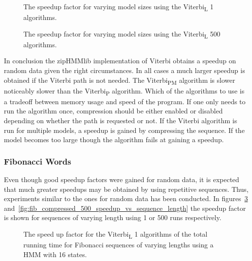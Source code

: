 \begin{figure}
  \centering
  
  \caption{The speedup factor for varying model sizes using the Viterbi\textsubscript{L} 1
    algorithms.}
  \label{fig:speedup_vs_N}
\end{figure}

\begin{figure}
  \centering
  
  \caption{The speedup factor for varying model sizes using the Viterbi\textsubscript{L} 500
    algorithms.}
  \label{fig:speedup_vs_N2}
\end{figure}

In conclusion the zipHMMlib implementation of Viterbi obtains a speedup on
random data given the right circumstances. In all cases a much larger speedup
is obtained if the Viterbi path is not needed. The Viterbi\textsubscript{PM}
algorithm is slower noticeably slower than the Viterbi\textsubscript{P} algorithm. Which
of the algorithms to use is a tradeoff between memory usage and speed of the
program. If one only needs to run the algorithm once, compression should be
either enabled or disabled depending on whether the path is requested or
not. If the Viterbi algorithm is run for multiple models, a speedup is gained
by compressing the sequence. If the model becomes too large though the
algorithm fails at gaining a speedup.

\subsubsection{Fibonacci Words}

Even though good speedup factors were gained for random data, it is expected
that much greater speedups may be obtained by using repetitive
sequences. Thus, experiments similar to the ones for random data has been
conducted. In figures~\ref{fig:fib_compressed_1_speedup_vs_sequence_length}
and~\ref{fig:fib_compressed_500_speedup_vs_sequence_length} the speedup factor
is shown for sequences of varying length using 1 or 500 runs respectively.

\begin{figure}
  \centering
  
  \caption{The speed up factor for the Viterbi\textsubscript{L} 1 algorithms of the total
    running time for Fibonacci sequences of varying
    lengths using a HMM with 16 states.}
  \label{fig:fib_compressed_1_speedup_vs_sequence_length}
\end{figure}

